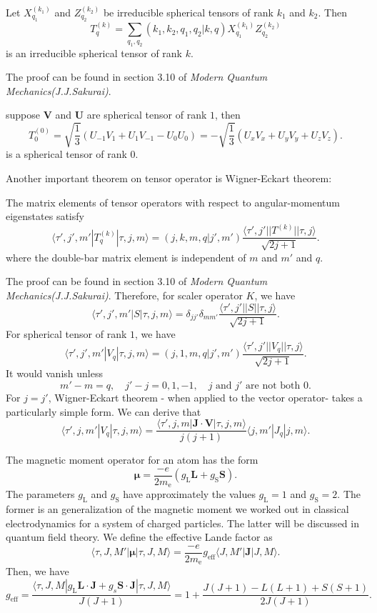 \begin{newthem}
Let $X^{(k_1)}_{q_1}$ and $Z^{(k_2)}_{q_2}$ be irreducible spherical tensors of rank $k_1$ and $k_2$. Then
\[T^{(k)}_{q} = \sum_{q_1,q_2} (k_1,k_2,q_1,q_2|k,q) X^{(k_1)}_{q_1} Z^{(k_2)}_{q_2}\]
is an irreducible spherical tensor of rank $k$. 
\end{newthem}
\noindent
The proof can be found in section 3.10 of \emph{Modern Quantum Mechanics(J.J.Sakurai)}.

\begin{example}
suppose $\bm{V}$ and $\bm{U}$ are spherical tensor of rank $1$, then
\[T^{(0)}_{0} = \sqrt{\frac{1}{3}} (U_{-1}V_{1} + U_{1}V_{-1}-U_{0}U_{0}) = - \sqrt{\frac{1}{3}} (U_xV_x + U_yV_y + U_zV_z).\]
is a spherical tensor of rank $0$.
\end{example}

\noindent
Another important theorem on tensor operator is Wigner-Eckart theorem:\\

\begin{newthem}
The matrix elements of tensor operators with respect to angular-momentum eigenstates satisfy
\[\langle \tau',j',m'| T^{(k)}_{q}| \tau,j,m\rangle = (j,k,m,q|j',m') \frac{\langle \tau',j' || T^{(k)} || \tau,j\rangle}{\sqrt{2j+1}}.\]
where the double-bar matrix element is independent of $m$ and $m'$ and $q$.
\end{newthem}

\noindent
The proof can be found in section 3.10 of \emph{Modern Quantum Mechanics(J.J.Sakurai)}.
Therefore, for scaler operator $K$, we have
\[\langle \tau',j',m'| S| \tau,j,m\rangle = \delta_{jj'}\delta_{mm'} \frac{\langle \tau',j' || S || \tau,j\rangle}{\sqrt{2j+1}}.\]
For spherical tensor of rank $1$, we have
\[\langle \tau',j',m'| V_{q} | \tau,j,m\rangle = (j,1,m,q|j',m') \frac{\langle \tau',j' || V_q || \tau,j\rangle}{\sqrt{2j+1}}.\]
It would vanish unless
\[m'-m = q , \quad j'-j = 0,1,-1 , \quad j \mbox{ and } j' \mbox{ are not both  } 0.\]
For $j=j'$, Wigner-Eckart theorem - when applied to the vector operator- takes a particularly simple form. We can derive that
\[\langle \tau',j,m' | V_q | \tau, j ,m \rangle = \frac{\langle \tau',j,m | \bm{J}\cdot\bm{V} | \tau, j ,m \rangle}{j(j+1)} \langle j,m' | J_q | j ,m \rangle.\]

\begin{example}
The magnetic moment operator for an atom has the form
\[\bm{\mu} = \frac{-e}{2m_{\mathrm{e}} } (g_{\mathrm{L}}\bm{L} + g_{\mathrm{S}} \bm{S}).\]
The parameters $g_{\mathrm{L}}$ and $g_{\mathrm{S}}$ have approximately the
values $g_{\mathrm{L}} = 1$ and $g_{\mathrm{S}} = 2$. The former is an generalization of the magnetic moment we worked out in classical electrodynamics for a system of charged particles. The latter will be discussed in quantum field theory.
We define the effective Lande factor as
\[\langle \tau,J,M' | \bm{\mu} | \tau,J,M \rangle = \frac{-e}{2m_{\mathrm{e}} } g_{\mathrm{eff}} \langle J,M' | \bm{J} | J,M \rangle.\]
Then, we have
\[g_{\mathrm{eff}} = \frac{\langle \tau,J,M | g_{\mathrm{L}}\bm{L}\cdot\bm{J} + g_s \bm{S}\cdot\bm{J} | \tau,J,M \rangle}{J(J+1)} = 1 + \frac{J(J+1)- L(L+1) + S(S+1)}{2J(J+1)}.\]
\end{example}


